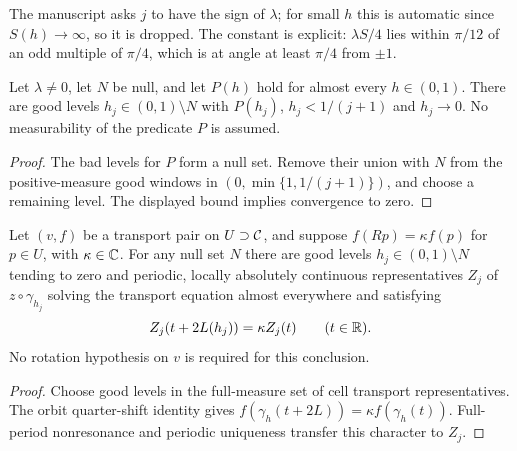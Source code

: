 \begin{remark}
The manuscript asks $j$ to have the sign of $\lambda$; for small $h$ this is automatic
since $S(h)\to\infty$, so it is dropped. The constant is explicit: $\lambda S/4$ lies
within $\pi/12$ of an odd multiple of $\pi/4$, which is at angle at least $\pi/4$ from
$\pm1$.
\end{remark}

\begin{lemma}
\label{lem:good-level-selection}
\leanok
Let $\lambda\ne0$, let $N$ be null, and let $P(h)$ hold for almost every
$h\in(0,1)$. There are good levels $h_j\in(0,1)\setminus N$ with
$P(h_j)$, $h_j<1/(j+1)$ and $h_j\to0$. No measurability of the predicate
$P$ is assumed.
\end{lemma}

\begin{proof}
\leanok
The bad levels for $P$ form a null set. Remove their union with $N$ from
the positive-measure good windows in $(0,\min\{1,1/(j+1)\})$, and choose a
remaining level. The displayed bound implies convergence to zero.
\end{proof}

\begin{lemma}
\label{lem:good-level-transport}
\leanok
Let $(v,f)$ be a transport pair on $U\supset\mathcal{C}$, and suppose
$f(Rp)=\kappa f(p)$ for $p\in U$, with $\kappa\in\mathbb{C}$. For any null set $N$
there are good levels $h_j\in(0,1)\setminus N$ tending to zero and periodic,
locally absolutely continuous representatives $Z_j$ of $z\circ\gamma_{h_j}$
solving the transport equation almost everywhere and satisfying
\[
 Z_j(t+2L(h_j))=\kappa Z_j(t)\qquad(t\in\mathbb{R}).
\]
No rotation hypothesis on $v$ is required for this conclusion.
\end{lemma}

\begin{proof}
\leanok
Choose good levels in the full-measure set of cell transport representatives.
The orbit quarter-shift identity gives
$f(\gamma_h(t+2L))=\kappa f(\gamma_h(t))$.
Full-period nonresonance and periodic uniqueness transfer this character to $Z_j$.
\end{proof}

